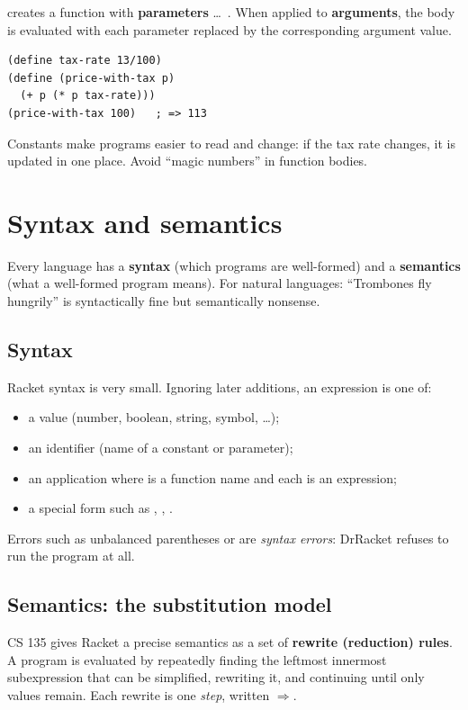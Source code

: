 \begin{definition}
 creates a function with
\textbf{parameters}  \ldots\ . When applied to
\textbf{arguments}, the body is evaluated with each parameter replaced by the
corresponding argument value.
\end{definition}

\begin{lstlisting}[style=racket]
(define tax-rate 13/100)
(define (price-with-tax p)
  (+ p (* p tax-rate)))
(price-with-tax 100)   ; => 113
\end{lstlisting}

Constants make programs easier to read and change: if the tax rate changes, it
is updated in one place. Avoid ``magic numbers'' in function bodies.

\section{Syntax and semantics}

Every language has a \textbf{syntax} (which programs are well-formed) and a
\textbf{semantics} (what a well-formed program means). For natural languages:
``Trombones fly hungrily'' is syntactically fine but semantically nonsense.

\subsection{Syntax}
Racket syntax is very small. Ignoring later additions, an expression is one of:
\begin{itemize}
  \item a value (number, boolean, string, symbol, \ldots);
  \item an identifier (name of a constant or parameter);
  \item an application  where  is a function name and each  is an expression;
  \item a special form such as , , .
\end{itemize}
Errors such as unbalanced parentheses or  are
\emph{syntax errors}: DrRacket refuses to run the program at all.

\subsection{Semantics: the substitution model}
CS 135 gives Racket a precise semantics as a set of \textbf{rewrite (reduction)
rules}. A program is evaluated by repeatedly finding the leftmost innermost
subexpression that can be simplified, rewriting it, and continuing until only
values remain. Each rewrite is one \emph{step}, written $\Rightarrow$.

